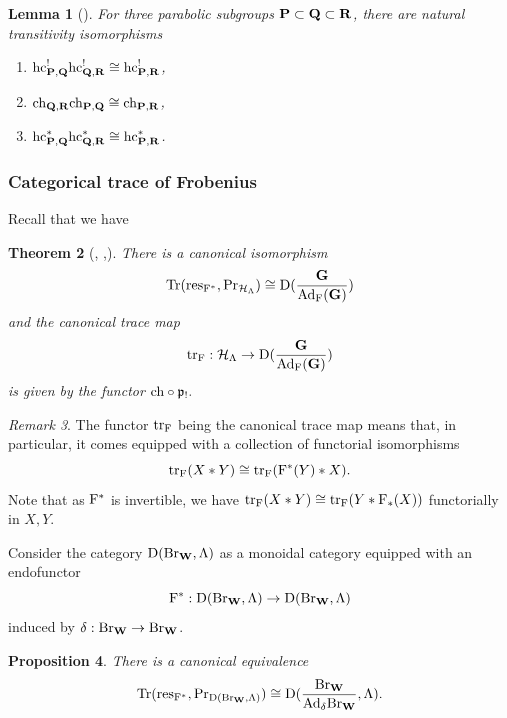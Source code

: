 \documentclass[article, 10pt, oneside, reqno]{amsart}
\theoremstyle{plain}
\newtheorem{thm}{Theorem}[subsection]
\newtheorem{lem}[thm]{Lemma}
\newtheorem{prop}[thm]{Proposition}
\theoremstyle{definition}
\theoremstyle{remark}
\newtheorem{rque}[thm]{Remark}
\newcommand{\Prr}{\mathrm{Pr}}
\newcommand{\restr}{\mathrm{res}}
\begin{document}
\begin{lem}[]
For three parabolic subgroups $\mathbf{P} \subset \mathbf{Q} \subset \mathbf{R}$, there are natural transitivity isomorphisms 
\begin{enumerate}
\item $\mathrm{hc}_{\mathbf{P},\mathbf{Q}}^!\mathrm{hc}_{\mathbf{Q},\mathbf{R}}^! \cong \mathrm{hc}_{\mathbf{P},\mathbf{R}}^!$,
\item $\mathrm{ch}_{\mathbf{Q},\mathbf{R}}\mathrm{ch}_{\mathbf{P},\mathbf{Q}} \cong \mathrm{ch}_{\mathbf{P},\mathbf{R}}$,
\item $\mathrm{hc}_{\mathbf{P},\mathbf{Q}}^*\mathrm{hc}_{\mathbf{Q},\mathbf{R}}^* \cong \mathrm{hc}_{\mathbf{P},\mathbf{R}}^*$.
\end{enumerate}
\end{lem}

\subsubsection{Categorical trace of Frobenius}

Recall that we have 
\begin{thm}[, \cite{ZhuCategoricalTame},\cite{GaitsgoryRozemblyumVarshavsky}]
There is a canonical isomorphism 
$$\Tr(\restr_{\Frob^*}, \Prr_{\Hcal_{\Lambda}}) \cong \DD(\frac{\Gbf}{\Ad_{\Frob}(\Gbf)})$$ 
and the canonical trace map 
$$\mathrm{tr}_{\mathrm{F}} : \mathcal{H}_{\Lambda} \to \mathrm{D}(\frac{\mathbf{G}}{\mathrm{Ad}_{\mathrm{F}}(\mathbf{G})})$$ 
is given by the functor $\mathrm{ch} \circ \mathfrak{p}_!.$
\end{thm}

\begin{rque}\label{rque:canonical-trace-functor}
The functor $\mathrm{tr}_{\mathrm{F}}$ being the canonical trace map means that, in particular, it comes equipped with a collection of functorial isomorphisms
$$\mathrm{tr}_{\mathrm{F}}(X * Y) \cong \mathrm{tr}_{\mathrm{F}}(\mathrm{F}^*(Y) * X).$$
Note that as $\mathrm{F}^*$ is invertible, we have $\mathrm{tr}_{\mathrm{F}}(X * Y) \cong \mathrm{tr}_{\mathrm{F}}(Y * \mathrm{F}_*(X))$ functorially in $X,Y$. 
\end{rque} 

Consider the category $\mathrm{D}(\mathrm{Br}_{\mathbf{W}}, \Lambda)$ as a monoidal category equipped with an endofunctor 
$$\mathrm{F}^* : \mathrm{D}(\mathrm{Br}_{\mathbf{W}}, \Lambda) \to \mathrm{D}(\mathrm{Br}_{\mathbf{W}}, \Lambda)$$ 
induced by $\delta : \mathrm{Br}_{\mathbf{W}} \to \mathrm{Br}_{\mathbf{W}}$. 
\begin{prop}
There is a canonical equivalence 
$$\Tr(\restr_{\Frob^*}, \Prr_{\DD(\Br_{\Wbf}, \Lambda)}) \cong \DD(\frac{\Br_{\Wbf}}{\Ad_{\delta}\Br_{\Wbf}}, \Lambda).$$
\end{prop}
\end{document}
